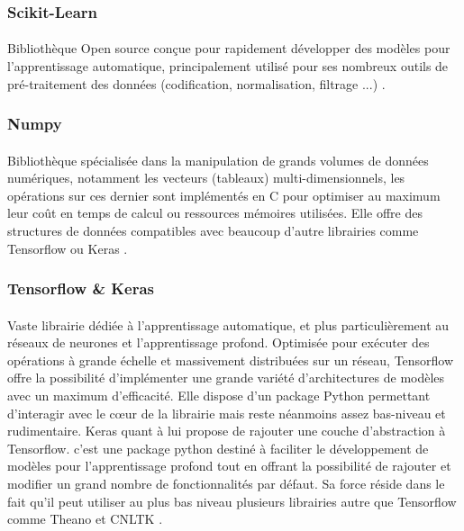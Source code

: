 		\subsubsection*{Scikit-Learn}
		\paragraph{}
		Bibliothèque Open source conçue pour rapidement développer des modèles pour l'apprentissage automatique, principalement utilisé pour ses nombreux outils de pré-traitement des données (codification, normalisation, filtrage ...) \cite{sklearn}.
		
		\subsubsection*{Numpy}
		\paragraph{}
		Bibliothèque spécialisée dans la manipulation de grands volumes de données numériques, notamment les vecteurs (tableaux) multi-dimensionnels, les opérations sur ces dernier sont implémentés en C pour optimiser au maximum leur coût en temps de calcul ou ressources mémoires utilisées. Elle offre des structures de données compatibles avec beaucoup d'autre librairies comme Tensorflow ou Keras \cite{numpy}.
		
		\subsubsection*{Tensorflow \& Keras}\label{tf&keras}
		\paragraph{}
		Vaste librairie dédiée à l'apprentissage automatique, et plus particulièrement au réseaux de neurones et l'apprentissage profond. Optimisée pour exécuter des opérations à grande échelle et massivement distribuées sur un réseau, Tensorflow offre la possibilité d'implémenter une grande variété d'architectures de modèles avec un maximum d'efficacité. Elle dispose d'un package Python permettant d'interagir avec le cœur de la librairie mais reste néanmoins assez bas-niveau et rudimentaire. Keras quant à lui propose de rajouter une couche d'abstraction à Tensorflow. c'est une package python destiné à faciliter le développement de modèles pour l'apprentissage profond tout en offrant la possibilité de rajouter et modifier un grand nombre de fonctionnalités par défaut. Sa force réside dans le fait qu'il peut utiliser au plus bas niveau plusieurs librairies autre que Tensorflow comme Theano et CNLTK \cite{tf,keras,theano,cnltk}.
		
